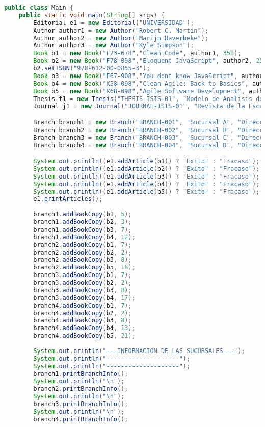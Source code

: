\documentclass{article}
\begin{document}
\begin{itemize}
        \begin{lstlisting}[language=java]
public class Main {
    public static void main(String[] args) {
        Editorial e1 = new Editorial("UNIVERSIDAD");
        Author author1 = new Author("Robert C. Martin");
        Author author2 = new Author("Marijn Haverbeke");
        Author author3 = new Author("Kyle Simpson");
        Book b1 = new Book("F23-678","Clean Code", author1, 358);
        Book b2 = new Book("F78-098","Eloquent JavaScript", author2, 250);
        b2.setISBN("978-612-00-0855-3");
        Book b3 = new Book("F67-908","You dont know JavaScript", author3, 410);
        Book b4 = new Book("K58-098","Clean Agile: Back to Basics", author1, 350);
        Book b5 = new Book("K68-098","Agile Software Development", author1, 950);
        Thesis t1 = new Thesis("THESIS-ISIS-01", "Modelo de Analisis del sentimiento en la Red Social Facebook usando Redes Neuronales", 118);
        Journal j1 = new Journal("JOURNAL-ISIS-01", "Revista de la Escuela Profesional de Ingenieria de Sistemas", 80);

        Branch branch1 = new Branch("BRANCH-001", "Sucursal A", "Direccion A");
        Branch branch2 = new Branch("BRANCH-002", "Sucursal B", "Direccion B");
        Branch branch3 = new Branch("BRANCH-003", "Sucursal C", "Direccion C");
        Branch branch4 = new Branch("BRANCH-004", "Sucursal D", "Direccion D");

        System.out.println((e1.addArticle(b1)) ? "Exito" : "Fracaso");
        System.out.println((e1.addArticle(b2)) ? "Exito" : "Fracaso");
        System.out.println((e1.addArticle(b3)) ? "Exito" : "Fracaso");
        System.out.println((e1.addArticle(b4)) ? "Exito" : "Fracaso");
        System.out.println((e1.addArticle(b5)) ? "Exito" : "Fracaso");
        e1.printArticles();
        
        branch1.addBookCopy(b1, 5);
        branch1.addBookCopy(b2, 3);
        branch1.addBookCopy(b3, 7);
        branch1.addBookCopy(b4, 12);
        branch2.addBookCopy(b1, 7);
        branch2.addBookCopy(b2, 2);
        branch2.addBookCopy(b3, 8);
        branch2.addBookCopy(b5, 18);
        branch3.addBookCopy(b1, 7);
        branch3.addBookCopy(b2, 2);
        branch3.addBookCopy(b3, 8);
        branch3.addBookCopy(b4, 17);
        branch4.addBookCopy(b1, 7);
        branch4.addBookCopy(b2, 2);
        branch4.addBookCopy(b3, 8);
        branch4.addBookCopy(b4, 13);
        branch4.addBookCopy(b5, 21);
        
        System.out.println("---INFORMACION DE LAS SUCURSALES---");
        System.out.println("--------------------");
        System.out.println("--------------------");
        branch1.printBranchInfo();
        System.out.println("\n");
        branch2.printBranchInfo();
        System.out.println("\n");
        branch3.printBranchInfo();
        System.out.println("\n");
        branch4.printBranchInfo();
        

\end{lstlisting}
\end{itemize}
\end{document}
